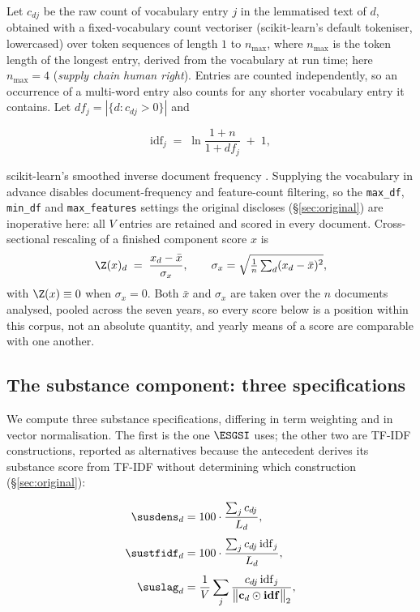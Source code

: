 Let $c_{dj}$ be the raw count of vocabulary entry $j$ in the lemmatised text
of $d$, obtained with a fixed-vocabulary count vectoriser (scikit-learn's
default tokeniser, lowercased) over token sequences of length $1$ to
$n_{\max}$, where $n_{\max}$ is the token length of the
longest entry, derived from the vocabulary at run time; here
$n_{\max} = 4$ (\emph{supply chain human right}). Entries are counted
independently, so an occurrence of a multi-word entry also counts for any
shorter vocabulary entry it contains. Let $df_j = |\{d : c_{dj} > 0\}|$ and

\begin{equation}
\label{eq:idf}
\mathrm{idf}_j \;=\; \ln\!\frac{1+n}{1+df_j} \;+\; 1 ,
\end{equation}

scikit-learn's smoothed inverse document frequency \citep{pedregosa2011}.
Supplying the vocabulary in advance disables document-frequency and
feature-count filtering, so the \texttt{max\_df}, \texttt{min\_df} and
\texttt{max\_features} settings the original discloses (\S\ref{sec:original})
are inoperative here: all $V$ entries are retained and scored in every
document.
Cross-sectional rescaling of a finished component score $x$ is
\begin{equation}
\label{eq:zscore}
\Z(x)_d \;=\; \frac{x_d - \bar{x}}{\sigma_x},
\qquad \sigma_x = \sqrt{\tfrac{1}{n}\textstyle\sum_d (x_d-\bar{x})^2},
\end{equation}
with $\Z(x) \equiv 0$ when $\sigma_x = 0$. Both $\bar{x}$ and $\sigma_x$ are
taken over the $n$ documents analysed, pooled across the seven years, so every
score below is a position within this corpus, not an absolute quantity, and
yearly means of a score are comparable with one another.

\subsection{The substance component: three specifications}
\label{sec:index-sus}

We compute three substance specifications, differing in term weighting and in
vector normalisation. The first is the one $\ESGSI$ uses; the other two are
TF-IDF constructions, reported as alternatives because the antecedent derives
its substance score from TF-IDF without determining which construction
(\S\ref{sec:original}):

\begin{align}
\label{eq:susdens}
\susdens_d   &= 100 \cdot \frac{\sum_{j} c_{dj}}{L_d}, \\[4pt]
\label{eq:sustfidf}
\sustfidf_d  &= 100 \cdot \frac{\sum_{j} c_{dj}\,\mathrm{idf}_j}{L_d}, \\[4pt]
\label{eq:suslag}
\suslag_d    &= \frac{1}{V} \sum_{j}
                \frac{c_{dj}\,\mathrm{idf}_j}
                     {\bigl\lVert \mathbf{c}_d \odot \mathbf{idf} \bigr\rVert_2},
\end{align}

